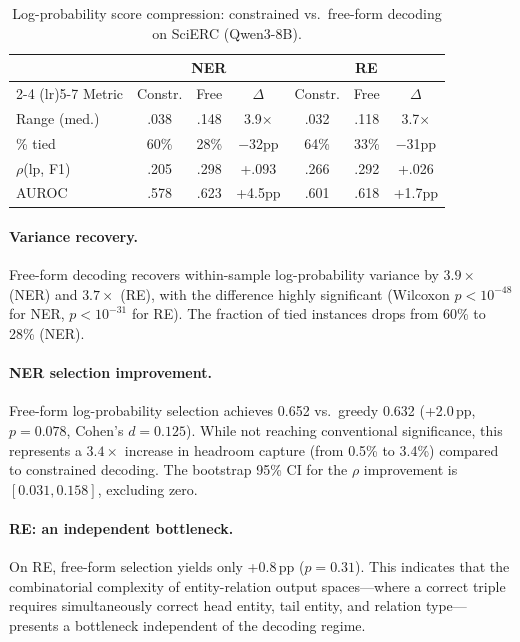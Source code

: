 \documentclass[11pt,a4paper]{article}
\begin{document}
\begin{table}[t]
\centering
\small
\caption{Log-probability score compression: constrained vs.\ free-form decoding on SciERC (Qwen3-8B).}
\label{tab:freeform-compression}
\begin{tabular}{lcccccc}
\toprule
& \multicolumn{3}{c}{\textbf{NER}} & \multicolumn{3}{c}{\textbf{RE}} \\
\cmidrule(lr){2-4} \cmidrule(lr){5-7}
Metric & Constr. & Free & $\Delta$ & Constr. & Free & $\Delta$ \\
\midrule
Range (med.) & .038 & .148 & 3.9$\times$ & .032 & .118 & 3.7$\times$ \\
\% tied & 60\% & 28\% & $-$32pp & 64\% & 33\% & $-$31pp \\
$\rho$(lp, F1) & .205 & .298 & +.093 & .266 & .292 & +.026 \\
AUROC & .578 & .623 & +4.5pp & .601 & .618 & +1.7pp \\
\bottomrule
\end{tabular}
\end{table}

\paragraph{Variance recovery.} Free-form decoding recovers within-sample log-probability variance by $3.9{\times}$ (NER) and $3.7{\times}$ (RE), with the difference highly significant (Wilcoxon $p < 10^{-48}$ for NER, $p < 10^{-31}$ for RE). The fraction of tied instances drops from 60\% to 28\% (NER).

\paragraph{NER selection improvement.} Free-form log-probability selection achieves 0.652 vs.\ greedy 0.632 (+2.0\,pp, $p{=}0.078$, Cohen's $d{=}0.125$). While not reaching conventional significance, this represents a $3.4{\times}$ increase in headroom capture (from 0.5\% to 3.4\%) compared to constrained decoding. The bootstrap 95\% CI for the $\rho$ improvement is $[0.031, 0.158]$, excluding zero.

\paragraph{RE: an independent bottleneck.} On RE, free-form selection yields only +0.8\,pp ($p{=}0.31$). This indicates that the combinatorial complexity of entity-relation output spaces---where a correct triple requires simultaneously correct head entity, tail entity, and relation type---presents a bottleneck independent of the decoding regime.
\end{document}
